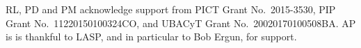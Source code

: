 \documentclass[aip,pop,reprint,amsmath,amssymb,floatfix]{revtex4-1}
\begin{document}
\acknowledgments RL, PD and PM acknowledge support from PICT Grant
No.~2015-3530, PIP Grant No.~11220150100324CO, and UBACyT Grant
No.~20020170100508BA. AP is is thankful to LASP, and in particular to
Bob Ergun, for support.



\end{document}
